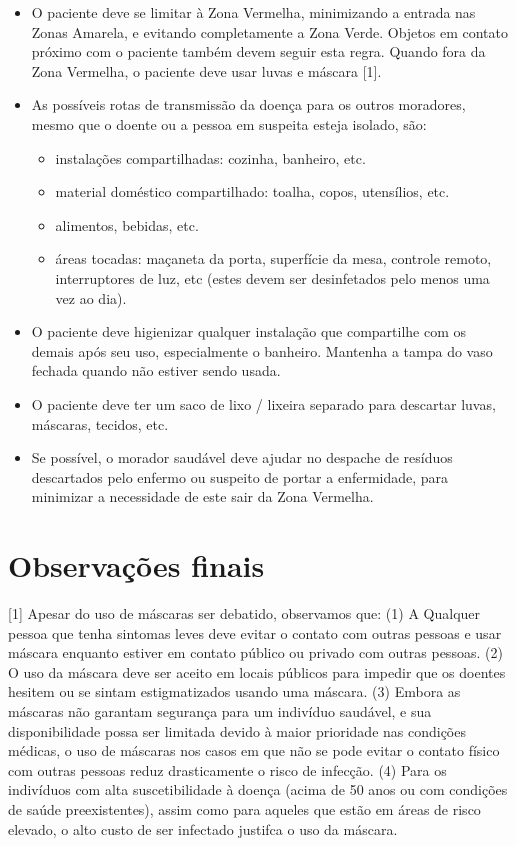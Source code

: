 \documentclass[onecolumn,journal]{IEEEtran}
\begin{document}
\begin{multicols}{2}
\begin{itemize}
\item O paciente deve se limitar à Zona Vermelha, minimizando a entrada nas Zonas Amarela, e evitando completamente a Zona Verde. Objetos em contato próximo com o paciente também devem seguir esta regra. Quando fora da Zona Vermelha, o paciente deve usar luvas e máscara [1].
\item As possíveis rotas de transmissão da doença para os outros moradores, mesmo que o doente ou a pessoa em suspeita esteja isolado, são:
\begin{itemize}
\item instalações compartilhadas: cozinha, banheiro, etc.
\item material doméstico compartilhado: toalha, copos, utensílios, etc.
\item alimentos, bebidas, etc.
\item áreas tocadas: maçaneta da porta, superfície da mesa, controle remoto, interruptores de luz, etc (estes devem ser desinfetados pelo menos uma vez ao dia).
\end{itemize}

\item O paciente deve higienizar qualquer instalação que compartilhe com os demais após seu uso, especialmente o banheiro. Mantenha a tampa do vaso fechada quando não estiver sendo usada.

\item O paciente deve ter um saco de lixo / lixeira separado para descartar luvas, máscaras, tecidos, etc.

\item Se possível, o morador saudável deve ajudar no despache de resíduos descartados pelo enfermo ou suspeito de portar a enfermidade, para minimizar a necessidade de este sair da Zona Vermelha.
\end{itemize}

\section*{Observações finais}

[1] Apesar do uso de máscaras ser debatido, observamos que: (1) A Qualquer pessoa que tenha sintomas leves deve evitar o contato com outras pessoas e usar máscara enquanto estiver em contato público ou privado com outras pessoas. (2) O uso da máscara deve ser aceito em locais públicos para impedir que os doentes hesitem ou se sintam estigmatizados usando uma máscara. (3) Embora as máscaras não garantam segurança para um indivíduo saudável, e sua disponibilidade possa ser limitada devido à maior prioridade nas condições médicas, o uso de máscaras nos casos em que não se pode evitar o contato físico com outras pessoas reduz drasticamente o risco de infecção. (4) Para os indivíduos com alta suscetibilidade à doença (acima de 50 anos ou com condições de saúde preexistentes), assim como para aqueles que estão em áreas de risco elevado, o alto custo de ser infectado justifca o uso da máscara.


\end{multicols}

\vspace{2ex}







% 

\end{document}
